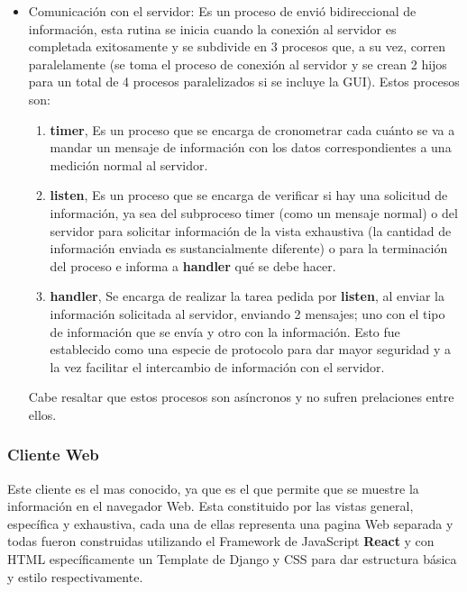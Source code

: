 \begin{itemize}
    \item Comunicación con el servidor: Es un proceso de envió bidireccional
        de información, esta rutina se inicia cuando la conexión al servidor
        es completada exitosamente y se subdivide en 3 procesos que, a su
        vez, corren paralelamente (se toma el proceso de conexión al servidor
        y se crean 2 hijos para un total de 4 procesos paralelizados si se
        incluye la GUI). Estos procesos son:

        \begin{enumerate}
            \item \textbf{timer}, Es un proceso que se encarga de cronometrar
                cada cuánto
                se va a mandar un mensaje de información con los datos
                correspondientes a una medición normal al servidor.

            \item \textbf{listen}, Es un proceso que se encarga de verificar si
                hay una
                solicitud de información, ya sea del subproceso timer (como un
                mensaje normal) o del servidor para solicitar información de la
                vista exhaustiva (la cantidad de información enviada es sustancialmente
                diferente) o para la terminación del proceso e informa a \textbf{handler}
                qué se debe hacer.

            \item \textbf{handler}, Se encarga de realizar la tarea pedida por \textbf{listen},
                al enviar la información solicitada al servidor, enviando 2 mensajes;
                uno con el tipo de información que se envía y otro con la información.
                Esto fue establecido como una especie de protocolo para dar mayor
                seguridad y a la vez facilitar el intercambio de información con
                el servidor.
        \end{enumerate}

        Cabe resaltar que estos procesos son asíncronos y no sufren prelaciones
        entre ellos.
\end{itemize}

\subsubsection{Cliente Web}

Este cliente es el mas conocido, ya que es el que permite que se muestre la
información en el navegador Web. Esta constituido por las vistas general,
específica y exhaustiva, cada una de ellas representa una pagina Web separada y
todas fueron construidas utilizando el Framework de JavaScript \textbf{React}
y con HTML específicamente un Template de Django y CSS para dar estructura
básica y estilo respectivamente.

